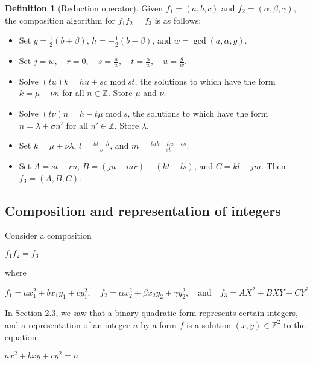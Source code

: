 \documentclass{article}
\theoremstyle{definition}
\newtheorem{definition}{Definition}[section]
\theoremstyle{theorem}
\theoremstyle{example}
\theoremstyle{corollary}
\begin{document}
\begin{definition}[Reduction operator]
Given \(f_{1} = (a, b, c)\) and \(f_{2} = (\alpha, \beta, \gamma)\), the composition algorithm for \(f_{1} f_{2} = f_{3}\) is as follows:
\begin{itemize}
\item Set \(g = \frac{1}{2} (b + \beta)\), \(h = - \frac{1}{2} (b - \beta)\), and \(w = \gcd(a, \alpha, g)\).
\item Set \(j = w, \quad r = 0, \quad s = \frac{a}{w}, \quad t = \frac{\alpha}{w}, \quad u = \frac{g}{w}\).
\item Solve \((tu)k = hu + sc \, \, \textrm{mod} \ st\), the solutions to which have the form \(k = \mu + \nu n\) for all \(n \in \mathbb{Z}\). Store \(\mu\) and \(\nu\).
\item Solve \((t\nu)n = h - t\mu \, \, \textrm{mod} \ s\), the solutions to which have the form \(n = \lambda + \sigma n'\) for all \(n' \in \mathbb{Z}\). Store \(\lambda\).
\item Set \(k = \mu + \nu \lambda\), \(l = \frac{kt - h}{s}\), and \(m = \frac{tuk - hu - cs}{st}\).
\item Set \(A = s t - r u\), \(B = (j u + m r) - (k t + l s)\), and \(C = k l - j m\). Then \(f_{3} = (A, B, C)\).
\end{itemize}






\bigskip

\subsection{Composition and representation of integers}

\bigskip

Consider a composition
\begin{center}
\(f_{1} f_{2} = f_{3}\)
\end{center}
where
\begin{center}
\(f_{1} = a x_{1}^{2} + b x_{1} y_{1} + c y_{1}^{2}, \quad f_{2} = \alpha x_{2}^{2} + \beta x_{2} y_{2} + \gamma y_{2}^{2}, \quad \textrm{and} \quad f_{3} = AX^{2} + BXY + CY^{2}\)
\end{center}

\bigskip

In Section 2.3, we saw that a binary quadratic form represents certain integers, and a representation of an integer \(n\) by a form \(f\) is a solution \((x, y) \in \mathbb{Z}^{2}\) to the equation
\begin{center}
\(ax^{2} + bxy + cy^{2} = n\)
\end{center}


\end{definition}
\end{document}
